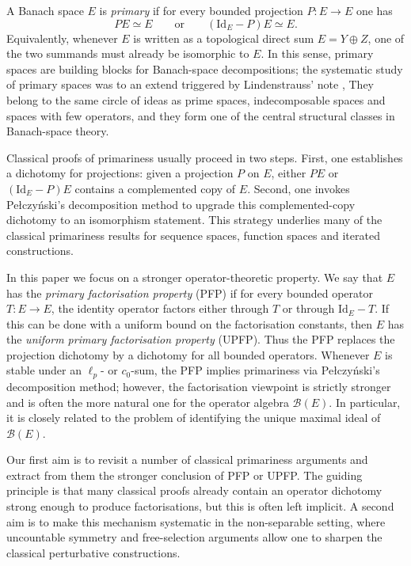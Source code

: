\documentclass[11pt]{amsart}
\theoremstyle{plain}
\theoremstyle{definition}
\numberwithin{equation}{section}
\newcommand{\Bop}{\mathcal{B}}
\newcommand{\Id}{\mathrm{Id}}
\begin{document}
A Banach space $E$ is \emph{primary} if for every bounded projection $P\colon E\to E$ one has
\[
PE\simeq E \qquad\text{or}\qquad (\Id_E-P)E\simeq E.
\]
Equivalently, whenever $E$ is written as a topological direct sum $E=Y\oplus Z$, one of the two summands must already be isomorphic to $E$.
In this sense, primary spaces are building blocks for Banach-space decompositions; the systematic study of primary spaces was to an extend triggered by Lindenstrauss' note \cite{Lindenstrauss1971},
They belong to the same circle of ideas as prime spaces, indecomposable spaces and spaces with few operators, and they form one of the central structural classes in Banach-space theory.

Classical proofs of primariness usually proceed in two steps.
First, one establishes a dichotomy for projections: given a projection $P$ on $E$, either $PE$ or $(\Id_E-P)E$
contains a complemented copy of $E$.
Second, one invokes Pe{\l}czy\'nski's decomposition method to upgrade this complemented-copy dichotomy to an isomorphism statement.
This strategy underlies many of the classical primariness results for sequence spaces, function spaces and iterated constructions.

In this paper we focus on a stronger operator-theoretic property.
We say that $E$ has the \emph{primary factorisation property} (PFP) if for every bounded operator
$T\colon E\to E$, the identity operator factors either through $T$ or through $\Id_E-T$.
If this can be done with a uniform bound on the factorisation constants, then $E$ has the
\emph{uniform primary factorisation property} (UPFP).
Thus the PFP replaces the projection dichotomy by a dichotomy for all bounded operators.
Whenever $E$ is stable under an $\ell_p$- or $c_0$-sum, the PFP implies primariness via Pe{\l}czy\'nski's decomposition method;
however, the factorisation viewpoint is strictly stronger and is often the more natural one for the operator algebra $\Bop(E)$.
In particular, it is closely related to the problem of identifying the unique maximal ideal of $\Bop(E)$.

Our first aim is to revisit a number of classical primariness arguments and extract from them the stronger conclusion of PFP or UPFP.
The guiding principle is that many classical proofs already contain an operator dichotomy strong enough to produce factorisations,
but this is often left implicit.
A second aim is to make this mechanism systematic in the non-separable setting, where uncountable symmetry and free-selection arguments allow one to sharpen the classical perturbative constructions.
\end{document}
